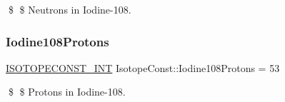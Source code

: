 \$ \$ Neutrons in Iodine-\/108. \mbox{\label{group___isotope_const-_iodine-_i108_gac3a7b31507c09c748be1d1d93c680a62}} 
\subsubsection{\texorpdfstring{Iodine108\+Protons}{Iodine108Protons}}
{\footnotesize\ttfamily \mbox{\hyperlink{group___isotope_const-_macros_ga5f18360b3e99483a35c32d789e62621c}{I\+S\+O\+T\+O\+P\+E\+C\+O\+N\+S\+T\+\_\+\+I\+NT}} Isotope\+Const\+::\+Iodine108\+Protons = 53}

\$ \$ Protons in Iodine-\/108. 